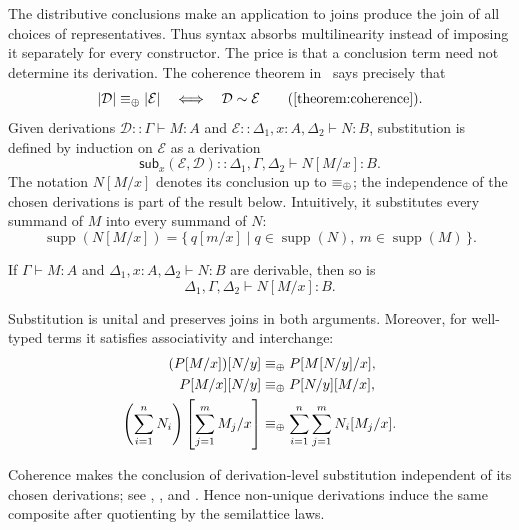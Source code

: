 The distributive conclusions make an application to joins produce the join of
all choices of representatives.  Thus syntax absorbs multilinearity instead
of imposing it separately for every constructor.  The price is that a
conclusion term need not determine its derivation.  The
coherence theorem in~ says precisely that
\[
|\mathcal D|\equiv_{\join}|\mathcal E|
\quad\Longleftrightarrow\quad
\mathcal D\sim\mathcal E
\qquad\text{(\Cref{theorem:coherence}).}
\]
Given derivations $\mathcal D::\Gamma\vdash M:A$ and
$\mathcal E::\Delta_1,x:A,\Delta_2\vdash N:B$, substitution is defined by
induction on $\mathcal E$ as a derivation
\[
\mathsf{sub}_x(\mathcal E,\mathcal D)
::\Delta_1,\Gamma,\Delta_2\vdash N[M/x]:B.
\]
The notation $N[M/x]$ denotes its conclusion up to $\equiv_{\mathbin{\oplus}}$; the
independence of the chosen derivations is part of the result below.
Intuitively, it substitutes every summand of $M$ into every summand of $N$:
\[
\operatorname{supp}(N[M/x])
=
\{\,q[m/x]\mid q\in\operatorname{supp}(N),\
m\in\operatorname{supp}(M)\,\}.
\]
\begin{lemma}
\label{lemma:subst_admissible_main}
If $\Gamma\vdash M:A$ and
$\Delta_1,x:A,\Delta_2\vdash N:B$ are derivable, then so is
\[
\Delta_1,\Gamma,\Delta_2\vdash N[M/x]:B.
\]
\end{lemma}

\begin{lemma}
\label{lemma:subst_properties_main}
Substitution is unital and preserves joins in both arguments.  Moreover, for
well-typed terms it satisfies associativity and interchange:
\begin{align*}
(P[M/x])[N/y]&\equiv_{\mathbin{\oplus}}P[M[N/y]/x],\\
P[M/x][N/y]&\equiv_{\mathbin{\oplus}}P[N/y][M/x],\\
\left(\sum_{i=1}^{n}N_i\right)
  \left[\sum_{j=1}^{m}M_j/x\right]
&\equiv_{\mathbin{\oplus}}
  \sum_{i=1}^{n}\sum_{j=1}^{m}N_i[M_j/x].
\end{align*}
\end{lemma}

Coherence makes the conclusion of derivation-level substitution independent
of its chosen derivations; see \Cref{def:substitution},
, and
.
Hence non-unique derivations induce the same composite after quotienting by
the semilattice laws.

